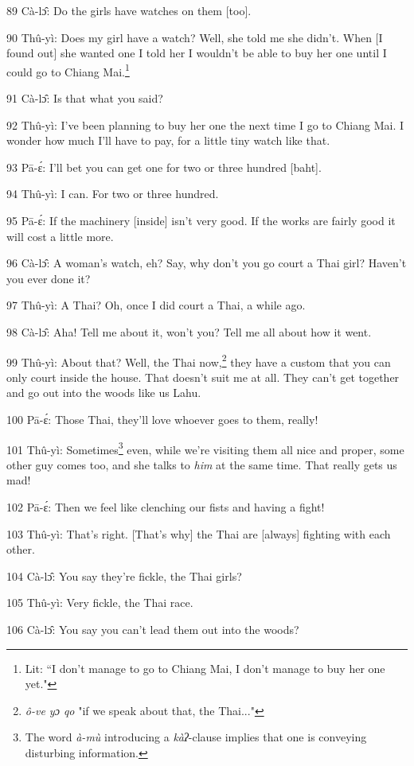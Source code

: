 89 Cà-lɔ̂: Do the girls have watches on them [too].

90 Thû-yì: Does my girl have a watch? Well, she told me she didn't. When [I found
out] she wanted one I told her I wouldn't be able to buy her one until I could
go to Chiang Mai.\footnote{Lit: ``I don't manage to go to Chiang Mai, I don't manage to buy her one yet."}

91 Cà-lɔ̂: Is that what you said?

92 Thû-yì: I've been planning to buy her one the next time I go to Chiang Mai.
I wonder how much I'll have to pay, for a little tiny watch like that.

93 Pā-ɛ́: I'll bet you can get one for two or three hundred [baht].

94 Thû-yì: I can. For two or three hundred.

95 Pā-ɛ́: If the machinery [inside] isn't very good. If the works are fairly
good it will cost a little more.

96 Cà-lɔ̂: A woman's watch, eh? Say, why don't you go court a Thai girl? Haven't
you ever done it?

97 Thû-yì: A Thai? Oh, once I did court a Thai, a while ago.

98 Cà-lɔ̂: Aha! Tell me about it, won't you? Tell me all about how it went.

99 Thû-yì: About that? Well, the Thai now,\footnote{\textit{ô-ve yɔ qo} "if we speak about that, the Thai..."} they have a custom that you can
only court inside the house. That doesn't suit me at all. They can't get together
and go out into the woods like us Lahu.

100 Pā-ɛ́: Those Thai, they'll love whoever goes to them, really!

101 Thû-yì: Sometimes\footnote{The word \textit{à-mù} introducing a \textit{kàʔ}-clause implies that one is conveying disturbing information.} even, while we're visiting them all nice and proper,
some other guy comes too, and she talks to \textit{him} at the same time. That
really gets us mad!

102 Pā-ɛ́: Then we feel like clenching our fists and having a fight!

103 Thû-yì: That's right. [That's why] the Thai are [always] fighting with each
other.

104 Cà-lɔ̂: You say they're fickle, the Thai girls?

105 Thû-yì: Very fickle, the Thai race.

106 Cà-lɔ̂: You say you can't lead them out into the woods?

